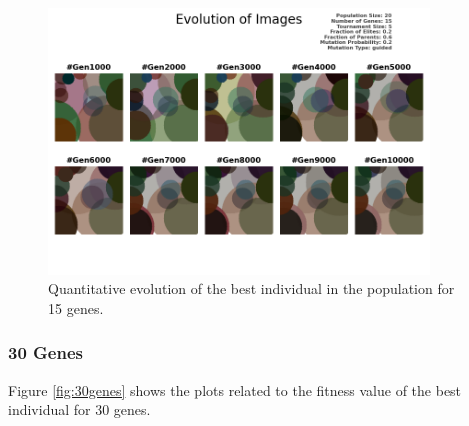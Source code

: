 \documentclass{assignment}
\begin{document}
\begin{figure}[!htb]
    \centering
    \includegraphics[width=0.9\textwidth]{figures/images_output_20_15_5_0.2_0.6_0.2_guided.png}
    \caption{Quantitative evolution of the best individual in the population for 15 genes.}
    \label{fig:15genes_image}
\end{figure}

\subsubsection{30 Genes}
Figure \ref{fig:30genes} shows the plots related to the fitness value of the best individual for 30 genes.
\end{document}
